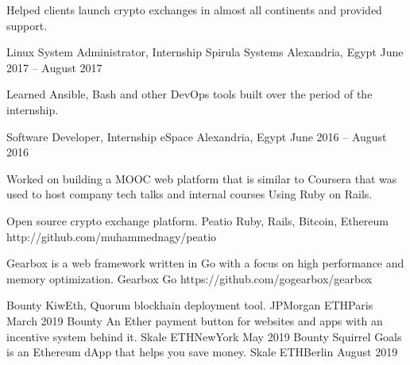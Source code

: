 \documentclass[]{awesome-cv}
\begin{document}
\begin{cventries}
{\begin{cvitems}
		\item {Helped clients launch crypto exchanges in almost all continents and provided support.}
		\end{cvitems}}
	\cventry
	{Linux System Administrator, Internship}
	{Spirula Systems}
	{Alexandria, Egypt}
	{June 2017 – August 2017}
	{\begin{cvitems}
		\item {Learned Ansible, Bash and other DevOps tools built over the period of the internship.}
		\end{cvitems}}
	\cventry
	{Software Developer, Internship}
	{eSpace}
	{Alexandria, Egypt}
	{June 2016 – August 2016}
	{\begin{cvitems}
		\item {Worked on building a MOOC web platform that is similar to Coursera that was used to host company tech talks and internal courses Using Ruby on Rails.}
		\end{cvitems}}
\end{cventries}

\vspace{-7mm}

\begin{cventries}
	\cventry
	{Open source crypto exchange platform.}
	{Peatio}
	{Ruby, Rails, Bitcoin, Ethereum}
	{http://github.com/muhammednagy/peatio}
	{}
	
	\vspace{-6mm}
	\cventry
	{Gearbox is a web framework written in Go with a focus on high performance and memory optimization.}
	{Gearbox}
	{Go}
	{https://github.com/gogearbox/gearbox}
	{}
	
	\vspace{-6mm}
\end{cventries}

\begin{cvhonors}
	\cvhonor
	{Bounty}
	{KiwEth, Quorum blockhain deployment tool.}
	{JPMorgan ETHParis}
	{March 2019}
	\cvhonor
	{Bounty}
	{An Ether payment button for websites and apps with an incentive system behind it.}
	{Skale ETHNewYork}
	{May 2019}
	\cvhonor
	{Bounty}
	{Squirrel Goals is an Ethereum dApp that helps you save money.}
	{Skale ETHBerlin}
	{August 2019}
\end{cvhonors}
\ 
\end{document}
